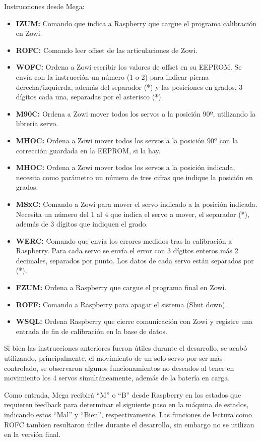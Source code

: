 Instrucciones desde Mega:

\begin{itemize}
  \item \textbf{IZUM:} Comando que indica a Raspberry que cargue el programa calibración en Zowi.
  \item \textbf{ROFC:} Comando leer offset de las articulaciones de Zowi.
  \item \textbf{WOFC:} Ordena a Zowi escribir los valores de offset en su EEPROM. Se envía con la instrucción un número (1 o 2) para indicar pierna derecha/izquierda, además del separador (*) y las posiciones en grados, 3 dígitos cada una, separadas por el asterisco (*).
  \item \textbf{M90C:} Ordena a Zowi mover todos los servos a la posición 90º, utilizando la librería servo.
  \item \textbf{MHOC:} Ordena a Zowi mover todos los servos a la posición 90º con la corrección guardada en la EEPROM, si la hay.
  \item \textbf{MHOC:} Ordena a Zowi mover todos los servos a la posición indicada, necesita como parámetro un número de tres cifras que indique la posición en grados.
  \item \textbf{MSxC:} Comando a Zowi para mover el servo indicado a la posición indicada. Necesita un número del 1 al 4 que indica el servo a mover, el separador (*), además de 3 dígitos que indiquen el grado.
  \item \textbf{WERC:} Comando que envía los errores medidos tras la calibración a Raspberry. Para cada servo se envía el error con 3 dígitos enteros más 2 decimales, separados por punto. Los datos de cada servo están separados por (*).
  \item \textbf{FZUM:} Ordena a Raspberry que cargue el programa final en Zowi.
  \item \textbf{ROFF:} Comando a Raspberry para apagar el sistema (Shut down).
  \item \textbf{WSQL:} Ordena Raspberry que cierre comunicación con Zowi y registre una entrada de fin de calibración en la base de datos.
\end{itemize}

Si bien las instrucciones anteriores fueron útiles durante el desarrollo, se acabó utilizando, principalmente, el movimiento de un solo servo por ser más controlado, se observaron algunos funcionamientos no deseados al tener en movimiento los 4 servos simultáneamente, además de la batería en carga.

Como entrada, Mega recibirá ``M'' o ``B'' desde Raspberry en los estados que requieren feedback para determinar el siguiente paso en la máquina de estados, indicando estos ``Mal'' y ``Bien'', respectivamente. Las funciones de lectura como ROFC tambien resultaron útiles durante el desarrollo, sin embargo no se utilizan en la versión final.

